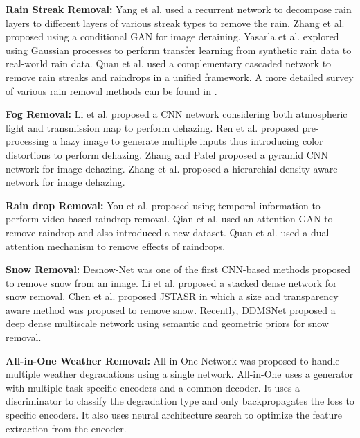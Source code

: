 \documentclass[10pt,twocolumn,letterpaper]{article}
\begin{document}
\noindent \textbf{Rain Streak Removal:} Yang et al. \cite{yang2019joint} used a recurrent network to decompose rain layers to different layers of various streak types to remove the rain. Zhang et al. \cite{zhang2019image} proposed using a conditional GAN for image deraining. Yasarla et al. \cite{yasarla2020syn2real} explored using Gaussian processes to perform transfer learning from synthetic rain data to real-world rain data. Quan et al. \cite{quan2021removing} used a complementary cascaded network to remove rain streaks and raindrops in a unified framework. A more detailed survey of various rain removal methods can be found in \cite{yang2019single}. 


\noindent \textbf{Fog Removal:}
Li et al. \cite{li2017aod} proposed a CNN
network considering both atmospheric light and transmission map to perform dehazing. Ren
et al. \cite{ren2018gated} proposed pre-processing a hazy image to generate multiple
inputs thus introducing color distortions to perform dehazing. Zhang and Patel \cite{zhang2018densely} proposed a pyramid CNN network for image dehazing. Zhang et al. \cite{zhang2021hierarchical} proposed a hierarchial density aware network for image dehazing.


\noindent \textbf{Rain drop Removal:} You et al. \cite{you2015adherent} proposed using temporal information to perform video-based raindrop removal. Qian et al. \cite{qian2018attentive} used an attention GAN to remove raindrop and also introduced a new dataset. Quan et al. \cite{quan2019deep} used a dual attention mechanism to remove effects of raindrops. 


\noindent \textbf{Snow Removal:} Desnow-Net \cite{liu2018desnownet} was one of the first CNN-based methods proposed to remove snow from an image. Li et al. \cite{li2019stacked} proposed a stacked dense network for snow removal. Chen et al. \cite{chen2020jstasr} proposed JSTASR in which a size and transparency aware method was proposed to remove snow. Recently, DDMSNet \cite{zhang2021hierarchical} proposed a deep dense multiscale network using semantic and geometric priors for snow removal.

\noindent \textbf{All-in-One Weather Removal:} All-in-One Network \cite{li2020all} was proposed to handle multiple weather degradations using a single network. All-in-One uses a generator with multiple task-specific encoders and a common decoder. It uses a discriminator to classify the degradation type and only backpropagates the loss to specific encoders. It also uses neural architecture search to optimize the feature extraction from the  encoder.
\end{document}
